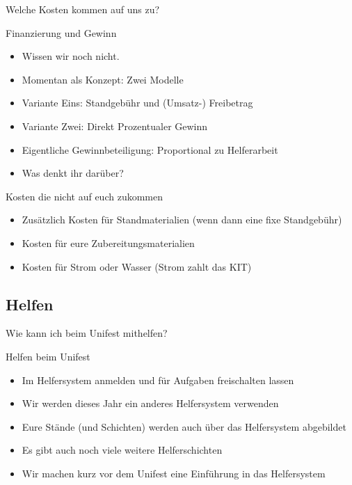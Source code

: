 \begin{frame}[standout]
    Welche Kosten kommen auf uns zu?
\end{frame}

\begin{frame}[c]{Finanzierung und Gewinn}
    \begin{itemize}[<+(1)->]
        \item Wissen wir noch nicht.
        \item Momentan als Konzept: Zwei Modelle
        \item Variante Eins: Standgebühr und (Umsatz-) Freibetrag
        \item Variante Zwei: Direkt Prozentualer Gewinn
        \item Eigentliche Gewinnbeteiligung: Proportional zu Helferarbeit
        \item Was denkt ihr darüber?
    \end{itemize}
\end{frame}


\begin{frame}[c]{Kosten die nicht auf euch zukommen}
    \begin{itemize}[<+(1)->]
        \item Zusätzlich Kosten für Standmaterialien (wenn dann eine fixe Standgebühr)
        \item Kosten für eure Zubereitungsmaterialien
        \item Kosten für Strom oder Wasser (Strom zahlt das KIT)
    \end{itemize}
\end{frame}



\subsection{Helfen}

\begin{frame}[standout]
    Wie kann ich beim Unifest mithelfen?
\end{frame}


\begin{frame}[c]{Helfen beim Unifest}
    \begin{itemize}[<+(1)->]
        \item Im Helfersystem anmelden und für Aufgaben freischalten lassen
        \item Wir werden dieses Jahr ein anderes Helfersystem verwenden
        \item Eure Stände (und Schichten) werden auch über das Helfersystem abgebildet
        \item Es gibt auch noch viele weitere Helferschichten
        \item Wir machen kurz vor dem Unifest eine Einführung in das Helfersystem
    \end{itemize}
\end{frame}


